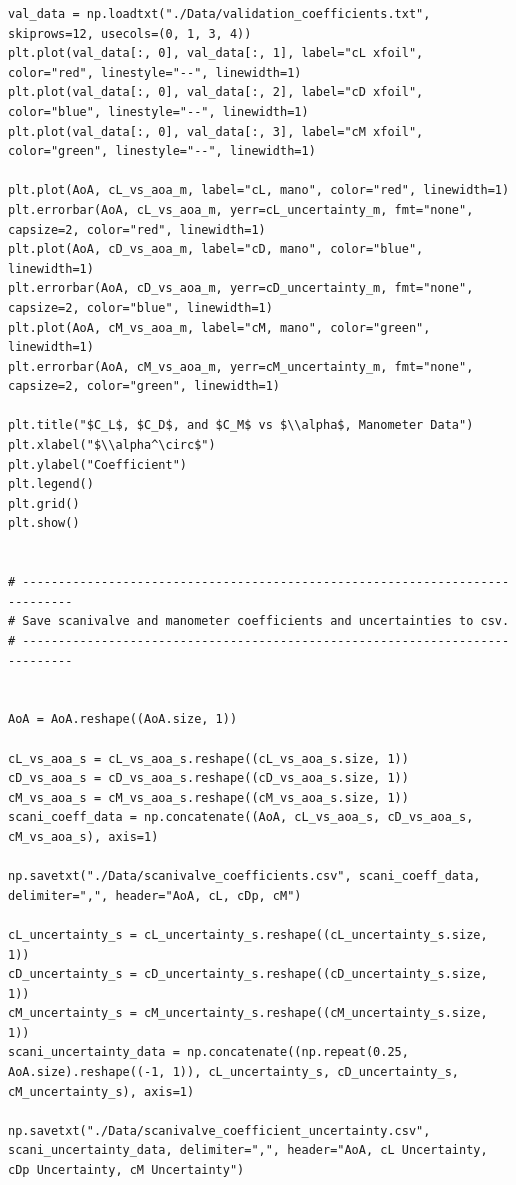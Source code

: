 \documentclass[runningheads]{llncs}
\begin{document}
\begin{verbatim}
val_data = np.loadtxt("./Data/validation_coefficients.txt", skiprows=12, usecols=(0, 1, 3, 4))
plt.plot(val_data[:, 0], val_data[:, 1], label="cL xfoil", color="red", linestyle="--", linewidth=1)
plt.plot(val_data[:, 0], val_data[:, 2], label="cD xfoil", color="blue", linestyle="--", linewidth=1)
plt.plot(val_data[:, 0], val_data[:, 3], label="cM xfoil", color="green", linestyle="--", linewidth=1)

plt.plot(AoA, cL_vs_aoa_m, label="cL, mano", color="red", linewidth=1)
plt.errorbar(AoA, cL_vs_aoa_m, yerr=cL_uncertainty_m, fmt="none", capsize=2, color="red", linewidth=1)
plt.plot(AoA, cD_vs_aoa_m, label="cD, mano", color="blue", linewidth=1)
plt.errorbar(AoA, cD_vs_aoa_m, yerr=cD_uncertainty_m, fmt="none", capsize=2, color="blue", linewidth=1)
plt.plot(AoA, cM_vs_aoa_m, label="cM, mano", color="green", linewidth=1)
plt.errorbar(AoA, cM_vs_aoa_m, yerr=cM_uncertainty_m, fmt="none", capsize=2, color="green", linewidth=1)

plt.title("$C_L$, $C_D$, and $C_M$ vs $\\alpha$, Manometer Data")
plt.xlabel("$\\alpha^\circ$")
plt.ylabel("Coefficient")
plt.legend()
plt.grid()
plt.show()


# -----------------------------------------------------------------------------
# Save scanivalve and manometer coefficients and uncertainties to csv.
# -----------------------------------------------------------------------------


AoA = AoA.reshape((AoA.size, 1))

cL_vs_aoa_s = cL_vs_aoa_s.reshape((cL_vs_aoa_s.size, 1))
cD_vs_aoa_s = cD_vs_aoa_s.reshape((cD_vs_aoa_s.size, 1))
cM_vs_aoa_s = cM_vs_aoa_s.reshape((cM_vs_aoa_s.size, 1))
scani_coeff_data = np.concatenate((AoA, cL_vs_aoa_s, cD_vs_aoa_s, cM_vs_aoa_s), axis=1)

np.savetxt("./Data/scanivalve_coefficients.csv", scani_coeff_data, delimiter=",", header="AoA, cL, cDp, cM")

cL_uncertainty_s = cL_uncertainty_s.reshape((cL_uncertainty_s.size, 1))
cD_uncertainty_s = cD_uncertainty_s.reshape((cD_uncertainty_s.size, 1))
cM_uncertainty_s = cM_uncertainty_s.reshape((cM_uncertainty_s.size, 1))
scani_uncertainty_data = np.concatenate((np.repeat(0.25, AoA.size).reshape((-1, 1)), cL_uncertainty_s, cD_uncertainty_s, cM_uncertainty_s), axis=1)

np.savetxt("./Data/scanivalve_coefficient_uncertainty.csv", scani_uncertainty_data, delimiter=",", header="AoA, cL Uncertainty, cDp Uncertainty, cM Uncertainty")


\end{verbatim}
\end{document}
